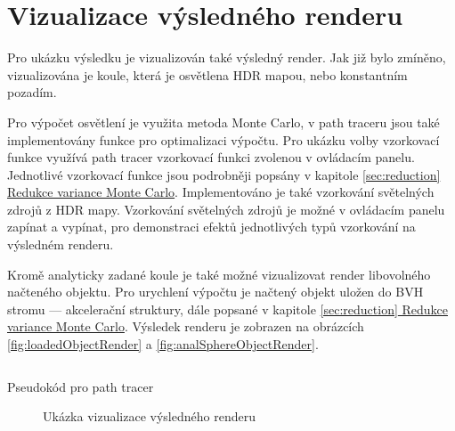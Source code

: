 \documentclass[czech,master]{diploma}
\begin{document}


\section{Vizualizace výsledného renderu}
Pro ukázku výsledku je vizualizován také výsledný render. Jak již bylo zmíněno, vizualizována je koule, která je osvětlena HDR mapou, nebo konstantním pozadím. \par
Pro výpočet osvětlení je využita metoda Monte Carlo, v path traceru jsou také implementovány funkce pro optimalizaci výpočtu. Pro ukázku volby vzorkovací funkce využívá path tracer vzorkovací funkci zvolenou v ovládacím panelu. Jednotlivé vzorkovací funkce jsou podrobněji popsány v kapitole \hyperref[sec:reduction]{\ref{sec:reduction} Redukce variance Monte Carlo}. Implementováno je také vzorkování světelných zdrojů z HDR mapy. Vzorkování světelných zdrojů je možné v ovládacím panelu zapínat a vypínat, pro demonstraci efektů jednotlivých typů vzorkování na výsledném renderu. \par
Kromě analyticky zadané koule je také možné vizualizovat render libovolného načteného objektu. Pro urychlení výpočtu je načtený objekt uložen do BVH stromu --- akcelerační struktury, dále popsané v kapitole \hyperref[sec:reduction]{\ref{sec:reduction} Redukce variance Monte Carlo}. Výsledek renderu je zobrazen na obrázcích \hyperref[fig:loadedObjectRender]{\ref{fig:loadedObjectRender}} a \hyperref[fig:analSphereObjectRender]{\ref{fig:analSphereObjectRender}}.

\begin{listing}[ht]
  \inputminted{python}{pathTracer.py}
  \caption{Pseudokód pro path tracer}
  \label{src:pathtracer}
\end{listing}

\begin{figure}[ht]%
  \centering
  \qquad
  \caption{Ukázka vizualizace výsledného renderu}%
  \label{fig:finalrender}%
\end{figure}
\end{document}
